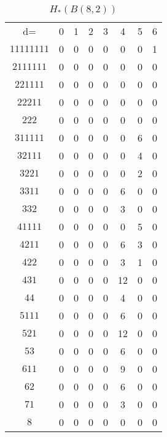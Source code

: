 \documentclass{elsart}
\begin{document}
\begin{table}
\begin{tabular}{cccccccc}
d= & 0 & 1 & 2 & 3 & 4 & 5 & 6  \\
$11111111$ & 0 & 0 & 0 & 0 & 0 & 0 & 1  \\
$2111111$  & 0 & 0 & 0 & 0 & 0 & 0 & 0  \\
$221111$   & 0 & 0 & 0 & 0 & 0 & 0 & 0  \\
$22211$    & 0 & 0 & 0 & 0 & 0 & 0 & 0  \\
$222$      & 0 & 0 & 0 & 0 & 0 & 0 & 0  \\
$311111$   & 0 & 0 & 0 & 0 & 0 & 6 & 0  \\
$32111$    & 0 & 0 & 0 & 0 & 0 & 4 & 0  \\
$3221$     & 0 & 0 & 0 & 0 & 0 & 2 & 0  \\
$3311$     & 0 & 0 & 0 & 0 & 6 & 0 & 0  \\
$332$      & 0 & 0 & 0 & 0 & 3 & 0 & 0  \\
$41111$    & 0 & 0 & 0 & 0 & 0 & 5 & 0  \\
$4211$     & 0 & 0 & 0 & 0 & 6 & 3 & 0  \\
$422$      & 0 & 0 & 0 & 0 & 3 & 1 & 0  \\
$431$      & 0 & 0 & 0 & 0 & 12 & 0 & 0  \\
$44$       & 0 & 0 & 0 & 0 & 4 & 0 & 0  \\
$5111$     & 0 & 0 & 0 & 0 & 6 & 0 & 0  \\
$521$      & 0 & 0 & 0 & 0 & 12 & 0 & 0  \\
$53$       & 0 & 0 & 0 & 0 & 6 & 0 & 0  \\
$611$      & 0 & 0 & 0 & 0 & 9 & 0 & 0  \\
$62$       & 0 & 0 & 0 & 0 & 6 & 0 & 0  \\
$71$       & 0 & 0 & 0 & 0 & 3 & 0 & 0  \\ $8$        & 0 & 0 & 0 & 0 & 0 & 0 & 0  \\
\end{tabular}
\caption[$H_*(B(8,2))$]{$H_*(B(8, 2))$}
\label{T:8_2}
\end{table}
\end{document}
